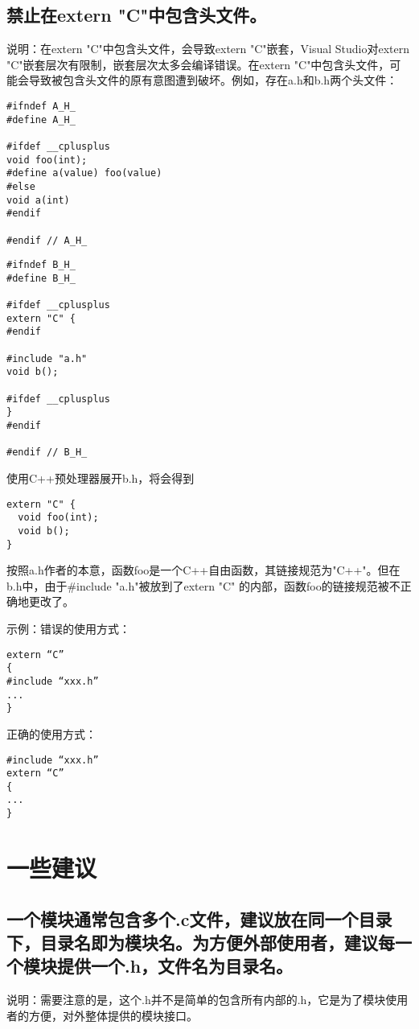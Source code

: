 \subsection{禁止在extern "C"中包含头文件。}
说明：在extern "C"中包含头文件，会导致extern "C"嵌套，Visual Studio对extern "C"嵌套层次有限制，嵌套层次太多会编译错误。在extern "C"中包含头文件，可能会导致被包含头文件的原有意图遭到破坏。例如，存在a.h和b.h两个头文件：
\begin{verbatim}
#ifndef A_H_
#define A_H_

#ifdef __cplusplus
void foo(int);
#define a(value) foo(value)
#else
void a(int)
#endif

#endif // A_H_
\end{verbatim}
\begin{verbatim}
#ifndef B_H_
#define B_H_

#ifdef __cplusplus
extern "C" {
#endif

#include "a.h"
void b();

#ifdef __cplusplus
}
#endif

#endif // B_H_
\end{verbatim}

使用C++预处理器展开b.h，将会得到
\begin{verbatim}
extern "C" {
  void foo(int);
  void b();
}
\end{verbatim}

按照a.h作者的本意，函数foo是一个C++自由函数，其链接规范为"C++"。但在b.h中，由于\#include "a.h"被放到了extern "C" { }的内部，函数foo的链接规范被不正确地更改了。

示例：错误的使用方式：
\begin{verbatim}
extern “C”
{
#include “xxx.h”
...
}
\end{verbatim}

正确的使用方式：
\begin{verbatim}
#include “xxx.h”
extern “C”
{
...
}
\end{verbatim}


\section{一些建议}

\subsection{一个模块通常包含多个.c文件，建议放在同一个目录下，目录名即为模块名。为方便外部使用者，建议每一个模块提供一个.h，文件名为目录名。}
说明：需要注意的是，这个.h并不是简单的包含所有内部的.h，它是为了模块使用者的方便，对外整体提供的模块接口。

